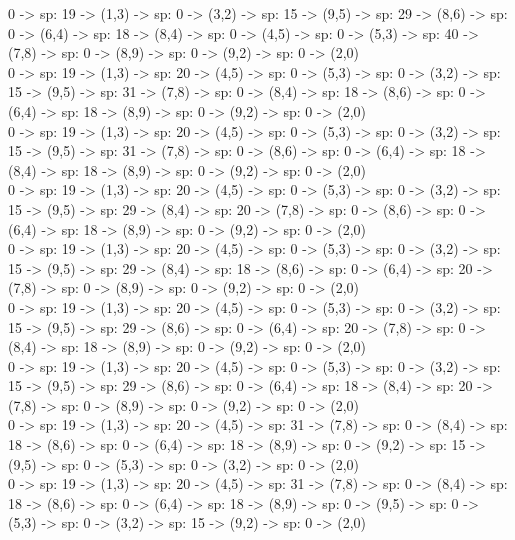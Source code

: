 \documentclass[10pt,a4paper]{article}
\begin{document}
0 -> sp: 19 -> (1,3) -> sp: 0 -> (3,2) -> sp: 15 -> (9,5) -> sp: 29 -> (8,6) -> sp: 0 -> (6,4) -> sp: 18 -> (8,4) -> sp: 0 -> (4,5) -> sp: 0 -> (5,3) -> sp: 40 -> (7,8) -> sp: 0 -> (8,9) -> sp: 0 -> (9,2) -> sp: 0 -> (2,0)\\

0 -> sp: 19 -> (1,3) -> sp: 20 -> (4,5) -> sp: 0 -> (5,3) -> sp: 0 -> (3,2) -> sp: 15 -> (9,5) -> sp: 31 -> (7,8) -> sp: 0 -> (8,4) -> sp: 18 -> (8,6) -> sp: 0 -> (6,4) -> sp: 18 -> (8,9) -> sp: 0 -> (9,2) -> sp: 0 -> (2,0)\\

0 -> sp: 19 -> (1,3) -> sp: 20 -> (4,5) -> sp: 0 -> (5,3) -> sp: 0 -> (3,2) -> sp: 15 -> (9,5) -> sp: 31 -> (7,8) -> sp: 0 -> (8,6) -> sp: 0 -> (6,4) -> sp: 18 -> (8,4) -> sp: 18 -> (8,9) -> sp: 0 -> (9,2) -> sp: 0 -> (2,0)\\

0 -> sp: 19 -> (1,3) -> sp: 20 -> (4,5) -> sp: 0 -> (5,3) -> sp: 0 -> (3,2) -> sp: 15 -> (9,5) -> sp: 29 -> (8,4) -> sp: 20 -> (7,8) -> sp: 0 -> (8,6) -> sp: 0 -> (6,4) -> sp: 18 -> (8,9) -> sp: 0 -> (9,2) -> sp: 0 -> (2,0)\\

0 -> sp: 19 -> (1,3) -> sp: 20 -> (4,5) -> sp: 0 -> (5,3) -> sp: 0 -> (3,2) -> sp: 15 -> (9,5) -> sp: 29 -> (8,4) -> sp: 18 -> (8,6) -> sp: 0 -> (6,4) -> sp: 20 -> (7,8) -> sp: 0 -> (8,9) -> sp: 0 -> (9,2) -> sp: 0 -> (2,0)\\

0 -> sp: 19 -> (1,3) -> sp: 20 -> (4,5) -> sp: 0 -> (5,3) -> sp: 0 -> (3,2) -> sp: 15 -> (9,5) -> sp: 29 -> (8,6) -> sp: 0 -> (6,4) -> sp: 20 -> (7,8) -> sp: 0 -> (8,4) -> sp: 18 -> (8,9) -> sp: 0 -> (9,2) -> sp: 0 -> (2,0)\\

0 -> sp: 19 -> (1,3) -> sp: 20 -> (4,5) -> sp: 0 -> (5,3) -> sp: 0 -> (3,2) -> sp: 15 -> (9,5) -> sp: 29 -> (8,6) -> sp: 0 -> (6,4) -> sp: 18 -> (8,4) -> sp: 20 -> (7,8) -> sp: 0 -> (8,9) -> sp: 0 -> (9,2) -> sp: 0 -> (2,0)\\

0 -> sp: 19 -> (1,3) -> sp: 20 -> (4,5) -> sp: 31 -> (7,8) -> sp: 0 -> (8,4) -> sp: 18 -> (8,6) -> sp: 0 -> (6,4) -> sp: 18 -> (8,9) -> sp: 0 -> (9,2) -> sp: 15 -> (9,5) -> sp: 0 -> (5,3) -> sp: 0 -> (3,2) -> sp: 0 -> (2,0)\\

0 -> sp: 19 -> (1,3) -> sp: 20 -> (4,5) -> sp: 31 -> (7,8) -> sp: 0 -> (8,4) -> sp: 18 -> (8,6) -> sp: 0 -> (6,4) -> sp: 18 -> (8,9) -> sp: 0 -> (9,5) -> sp: 0 -> (5,3) -> sp: 0 -> (3,2) -> sp: 15 -> (9,2) -> sp: 0 -> (2,0)\\
\end{document}
